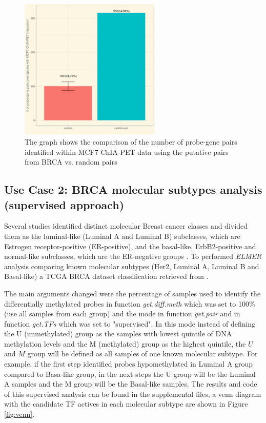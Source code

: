 %

\begin{figure}[ht!]
\centering
\includegraphics[width=0.6\textwidth]{images/validation.png}
\caption[MCF7 ChIA-PET validation]{\label{fig:chiapet} The graph shows the comparison of the number of probe-gene pairs identified within MCF7 ChIA-PET data using the putative pairs from BRCA vs. random pairs}
\end{figure}


\newpage
\subsection{Use Case 2: BRCA molecular subtypes analysis (supervised approach)}

Several studies identified distinct molecular Breast cancer classes and
divided them as the luminal-like (Luminal A and Luminal B) subclasses,
which are Estrogen receptor-positive (ER-positive), and the basal-like,
ErbB2-positive and normal-like subclasses, which are the ER-negative
groups \cite{perou2000molecular,yersal2014biological,sorlie2001gene}.
To performed \textit{ELMER} analysis comparing known molecular subtypes
(Her2, Luminal A, Luminal B and Basal-like) a TCGA BRCA dataset classification
retrieved from .


The main arguments changed were the percentage of samples used to identify the
differentially methylated probes in function \textit{get.diff.meth} which was
set to 100\% (use all samples from each group) and the mode in function \textit{get.pair}
and in function \textit{get.TFs} which was set to "supervised". In this mode instead
of defining the U (unmethylated) group as the samples with lowest quintile of DNA
methylation levels and the M (methylated) group as the highest quintile, the $U$ and $M$ group
 will be defined as all samples of one known molecular subtype.
 For example, if the first step identified probes hypomethylated in Luminal A group compared to Basa-like group,
in the next steps the U group will be the Luminal A samples and the M group will be the Basal-like samples.
The results and code of this supervised analysis can be found in the supplemental files,
a venn diagram with the candidate TF actives in each molecular subtype are shown in Figure \ref{fig:venn}.

